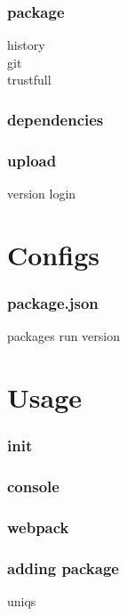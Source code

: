 \documentclass{beamer}
\begin{document}
\begin{frame}
\frametitle{package}
history\\
git\\
trustfull
\end{frame}

\begin{frame}
\frametitle{dependencies}

\end{frame}

\begin{frame}
\frametitle{upload}
version
login
\end{frame}

\section{Configs}

\begin{frame}
\frametitle{package.json}
packages
run
version
\end{frame}

\begin{frame}
\frametitle{}

\end{frame}

\begin{frame}
\frametitle{}

\end{frame}

\begin{frame}
\frametitle{}

\end{frame}


\section{Usage}

\begin{frame}
\frametitle{init}

\end{frame}

\begin{frame}
\frametitle{console}

\end{frame}

\begin{frame}
\frametitle{webpack}

\end{frame}

\begin{frame}
\frametitle{adding package}
uniqs
\end{frame}
\end{document}
